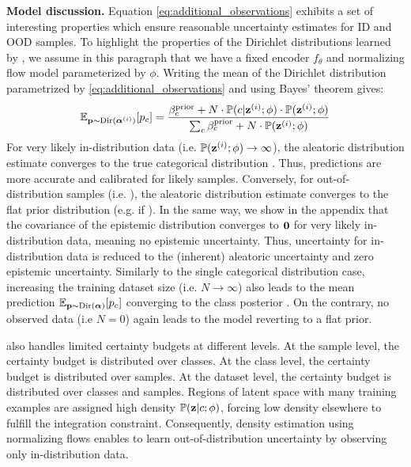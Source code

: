 \textbf{Model discussion.} Equation \ref{eq:additional_observations} exhibits a set of interesting properties which ensure reasonable uncertainty estimates for ID and OOD samples. To highlight the properties of the Dirichlet distributions learned by \oursacro, we assume in this paragraph that we have a fixed encoder $f_\theta$ and normalizing flow model parameterized by $\phi$. Writing the mean of the Dirichlet distribution parametrized by \eqref{eq:additional_observations} and using Bayes' theorem gives:
\begin{equation}
\mathbb{E}_{\mathbf{p}\sim \mathrm{Dir}(\boldsymbol{\alpha}^{(i)})}[p_c] = \frac{\beta_c^\text{prior} + N \cdot \mathbb{P}(c | \bold{z}^{(i)}; \phi) \cdot \mathbb{P}(\bold{z}^{(i)}; \phi)}{\sum_c\beta_c^\text{prior} + N \cdot \mathbb{P}(\bold{z}^{(i)}; \phi)}
\end{equation}
For very likely in-distribution data (i.e. $\mathbb{P}(\bold{z}^{(i)} ; \phi) \rightarrow \infty$), the aleatoric distribution estimate  converges to the true categorical distribution \smash{$\prob(\iclass|\latent \dataix; \phi)$}. Thus, predictions are more accurate and calibrated for likely samples. Conversely, for out-of-distribution samples (i.e. ), the aleatoric distribution estimate  converges to the flat prior distribution (e.g.  if ). In the same way, we show in the appendix that the covariance of the epistemic distribution converges to $\mathbf{0}$ for very likely in-distribution data, meaning no epistemic uncertainty. Thus, uncertainty for in-distribution data is reduced to the (inherent) aleatoric uncertainty and zero epistemic uncertainty.
%
Similarly to the single categorical distribution case, increasing the training dataset size (i.e. $N \rightarrow \infty$) also leads to the mean prediction $\mathbb{E}_{\mathbf{p}\sim \mathrm{Dir}(\boldsymbol{\alpha})}[p_c]$ converging to the class posterior . On the contrary, no observed data (i.e $N=0$) again leads to the model reverting to a flat prior.

\ours also handles limited certainty budgets at different levels. At the sample level, the certainty budget \smash{$\alpha_0\dataix = \sum_\iclass \alpha_\iclass\dataix$} is distributed over classes. At the class level, the certainty budget  is distributed over samples. At the dataset level, the certainty budget  is distributed over classes and samples. Regions of latent space with many training examples are assigned high density $\mathbb{P}(\bold{z} | c; \phi)$, forcing low density elsewhere to fulfill the integration constraint. Consequently, density estimation using normalizing flows enables \oursacro to learn out-of-distribution uncertainty by observing only in-distribution data.

